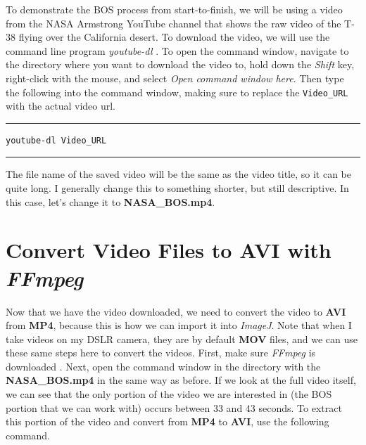 \documentclass[letterpaper,12pt]{article}
\begin{document}
To demonstrate the BOS process from start-to-finish, we will be using a video from the NASA Armstrong YouTube channel that shows the raw video of the T-38 flying over the California desert.  To download the video, we will use the command line program \textit{youtube-dl} \cite{youtube-dl}.  To open the command window, navigate to the directory where you want to download the video to, hold down the \textit{Shift} key, right-click with the mouse, and select \textit{Open command window here}.  Then type the following into the command window, making sure to replace the \texttt{Video\_URL} with the actual video url.

\par\noindent\rule{\textwidth}{0.4pt}

\vspace{1em}
\lstset{basicstyle=\large}
\begin{lstlisting}[style=CMD]
youtube-dl Video_URL
\end{lstlisting}

\par\noindent\rule{\textwidth}{0.4pt}

The file name of the saved video will be the same as the video title, so it can be quite long.  I generally change this to something shorter, but still descriptive.  In this case, let's change it to \textbf{NASA\_BOS.mp4}.

\section{Convert Video Files to AVI with \textit{FFmpeg}}
\label{sec:FFMPEG}

Now that we have the video downloaded, we need to convert the video to \textbf{AVI} from \textbf{MP4}, because this is how we can import it into \textit{ImageJ}.  Note that when I take videos on my DSLR camera, they are by default \textbf{MOV} files, and we can use these same steps here to convert the videos.  First, make sure \textit{FFmpeg} is downloaded \cite{ffmpeg}.  Next, open the command window in the directory with the \textbf{NASA\_BOS.mp4} in the same way as before.  If we look at the full video itself, we can see that the only portion of the video we are interested in (the BOS portion that we can work with) occurs between $33$ and $43$ seconds.  To extract this portion of the video and convert from \textbf{MP4} to \textbf{AVI}, use the following command.
\end{document}
